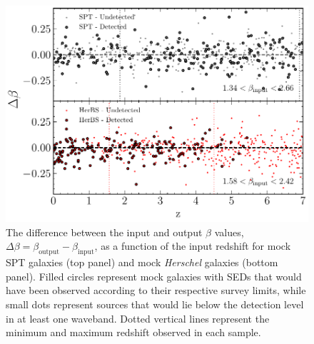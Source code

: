 \begin{figure}
	\centering
	\includegraphics[width=0.75\columnwidth]{figures/beta_simulations.pdf}
	\caption[Difference between input and output $\beta$ from simulations of mock galaxies]{The difference between the input and output $\beta$ values, $\Delta \beta = \beta_{\textrm{output}} - \beta_{\textrm{input}}$, as a function of the input redshift for mock SPT galaxies (top panel) and mock \textit{Herschel} galaxies (bottom panel). Filled circles represent mock galaxies with SEDs that would have been observed according to their respective survey limits, while small dots represent sources that would lie below the detection level in at least one waveband. Dotted vertical lines represent the minimum and maximum redshift observed in each sample.}
	\label{fig:beta_z_simulation}
\end{figure}

